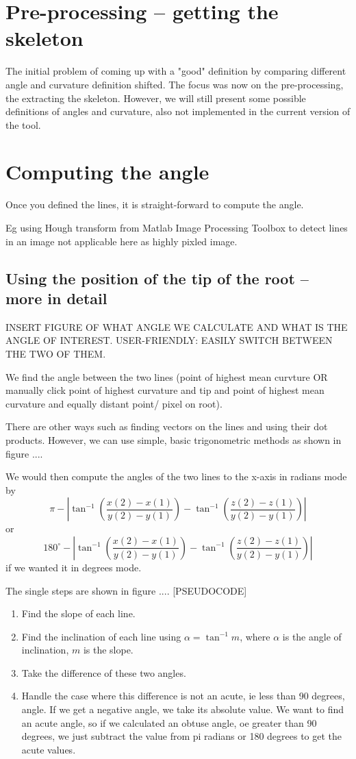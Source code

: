 \section{Pre-processing -- getting the skeleton}

The initial problem of coming up with a "good" definition by comparing different angle and curvature definition shifted. The focus was now on the pre-processing, the extracting the skeleton. 
However, we will still present some possible definitions of angles and curvature, also not implemented in the current version of the tool.

\section{Computing the angle}

Once you defined the lines, it is straight-forward to compute the angle.

Eg using Hough transform from Matlab Image Processing Toolbox to detect lines in an image not applicable here as highly pixled image.

\subsection{Using the position of the tip of the root -- more in detail}

INSERT FIGURE OF WHAT ANGLE WE CALCULATE AND WHAT IS THE ANGLE OF INTEREST. 
USER-FRIENDLY: EASILY SWITCH BETWEEN THE TWO OF THEM.

We find the angle between the two lines (point of highest mean curvture OR manually click point of highest curvature and tip and point of highest mean curvature and equally distant point/ pixel on root).

There are other ways such as finding vectors on the lines and using their dot products. However, we can use simple, basic trigonometric methods as shown in figure ....

We would then compute the angles of the two lines to the x-axis  in radians mode by 
\[
\pi - | \tan^{-1}(\frac{x(2) - x(1)}{y(2) - y(1)}) - \tan^{-1}(\frac{z(2) - z(1)}{y(2) - y(1)}) |
\]
or 
\[
180^{\circ} - | \tan^{-1}(\frac{x(2) - x(1)}{y(2) - y(1)}) - \tan^{-1}(\frac{z(2) - z(1)}{y(2) - y(1)}) |
\]
if we wanted it in degrees mode.

The single steps are shown in figure ....
[PSEUDOCODE]
\begin{enumerate}
	\item Find the slope of each line.
	\item Find the inclination of each line using \( \alpha = \tan^{-1} m \), where  \( \alpha \) is the angle of inclination, \( m \) is the slope.
	\item Take the difference of these two angles.
	\item Handle the case where this difference is not an acute, ie less than 90 degrees, angle. If we get a negative angle, we take its absolute value. We want to find an acute angle, so if we calculated an obtuse angle, oe greater than 90 degrees, we just subtract the value from pi radians or 180 degrees to get the acute values.
\end{enumerate}


